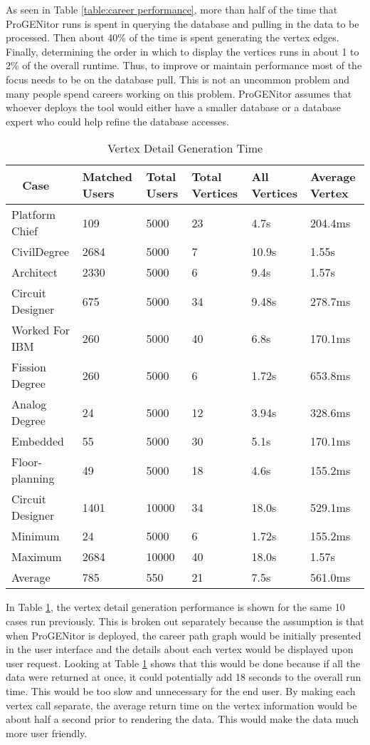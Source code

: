 As seen in Table \ref{table:career performance}, more than half of the time that
ProGENitor runs is spent in querying the database and pulling in the data to be
processed.  Then about 40\% of the time is spent generating the vertex
edges. Finally, determining the order in which to display the vertices runs
in about 1 to 2\% of the overall runtime.  Thus, to improve or maintain performance most of
the focus needs to be on the database pull.  This is not an uncommon problem and
many people spend careers working on this problem.  ProGENitor assumes that
whoever deploys the tool would either have a smaller database or a database
expert who could help refine the database accesses.

\begin{table}[H]
  \centering
  \begin{tabular}{|p{17mm}|p{16mm}|p{10mm}|p{18mm}|p{19mm}|p{20mm}|}
  \hline
  \
  Case&Matched Users&Total Users&Total Vertices&All Vertices&Average Vertex\\
  \hline\hline
  Platform Chief&109&5000&23&4.7s&204.4ms\\ \hline
  Civil\newline Degree&2684&5000&7&10.9s&1.55s\\ \hline 
  Architect&2330&5000&6&9.4s&1.57s\\ \hline
  Circuit Designer&675&5000&34&9.48s&278.7ms\\ \hline
  Worked For IBM&260&5000&40&6.8s&170.1ms\\ \hline
  Fission Degree&260&5000&6&1.72s&653.8ms\\ \hline
  Analog Degree&24&5000&12&3.94s&328.6ms\\ \hline
  Embedded&55&5000&30&5.1s&170.1ms\\ \hline
  Floor- \newline planning&49&5000&18&4.6s&155.2ms\\ \hline
  Circuit Designer&1401&10000&34&18.0s&529.1ms\\ \hline
  \hline\hline
  Minimum&24&5000&6&1.72s&155.2ms\\ \hline
  Maximum&2684&10000&40&18.0s&1.57s\\ \hline
  Average&785&550&21&7.5s&561.0ms\\ \hline
  \end{tabular}
  \caption{Vertex Detail Generation Time}
  \label{table:node-perf}
\end{table}

In Table \ref{table:node-perf}, the vertex detail generation performance is shown
for the same 10 cases run previously.  This is broken out separately because the
assumption is that when ProGENitor is deployed, the career path graph would be
initially presented in the user interface and the details about each vertex would be
displayed upon user request.  Looking at Table \ref{table:node-perf} shows that
this would be done because if all the data were returned at once, it could
potentially add 18 seconds to the overall run time.  This would be too slow and
unnecessary for the end user.  By making each vertex call separate, the average
return time on the vertex information would be about half a second prior to
rendering the data.  This would make the data much more user friendly.